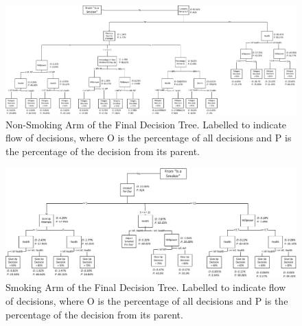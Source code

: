 \documentclass[]{report}
\begin{document}
\begin{landscape}
\begin{figure}
\begin{center}
\includegraphics[width=\paperwidth,keepaspectratio]{dectree-right-labelled.png}
\caption{Non-Smoking Arm of the Final Decision Tree. Labelled to indicate flow of decisions, where O is the percentage of all decisions and P is the percentage of the decision from its parent.}
\label{img:dectree-right-lab}
\end{center}
\end{figure}
\end{landscape}

\begin{landscape}
\begin{figure}
\begin{center}
\includegraphics[width=\paperwidth,keepaspectratio]{dectree-left-label.png}
\caption{Smoking Arm of the Final Decision Tree. Labelled to indicate flow of decisions, where O is the percentage of all decisions and P is the percentage of the decision from its parent.}
\label{img:dectree-left-lab}
\end{center}
\end{figure}
\end{landscape}
\end{document}
